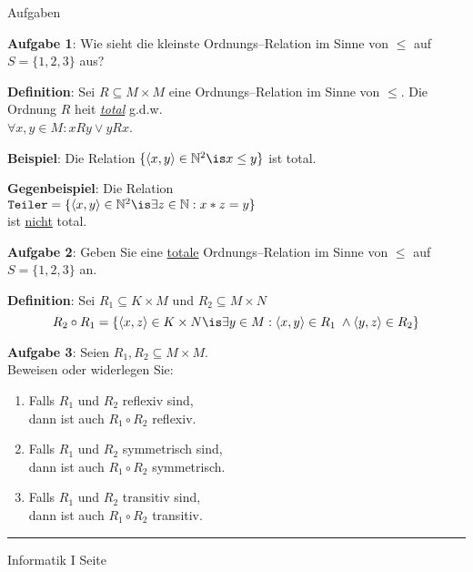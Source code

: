 \begin{slide}{}
\normalsize
\begin{center}
Aufgaben
\end{center}
\vspace{0.5cm}

\footnotesize
\textbf{Aufgabe 1}: Wie sieht die kleinste Ordnungs--Relation im Sinne von $\leq$ auf 
$S = \{1, 2, 3\}$ aus?
\vspace{0.5cm}

\textbf{Definition}: Sei $R \subseteq M \times M$ eine Ordnungs--Relation im Sinne von
$\leq$.  Die Ordnung $R$ hei\3t \underline{\emph{total}} g.d.w. \\[0.3cm]
\hspace*{1.3cm} $\forall x,y \in M: x R y \vee y R x$.

\textbf{Beispiel}: Die Relation $\{ \langle x, y \rangle \in \mathbb{N}^2 \is x \leq y \}$
ist total.

\textbf{Gegenbeispiel}: Die Relation \\[0.3cm]
\hspace*{1.3cm} $\mathtt{Teiler} = \{ \langle x, y \rangle \in \mathbb{N}^2 \is \exists z \in \mathbb{N}: x * z = y \}$ \\[0.3cm]
ist \underline{nicht} total.
\vspace{0.5cm}

\textbf{Aufgabe 2}: Geben Sie eine \underline{totale} Ordnungs--Relation im Sinne von $\leq$ auf 
$S = \{1, 2, 3\}$ an.
\vspace{0.5cm}

\textbf{Definition}: Sei $R_1 \subseteq K \times M$ und $R_2 \subseteq M \times N$
$$  R_2 \circ R_1 = \{ \langle x, z \rangle \in K \times N \is \exists y \in M: \langle x, y \rangle \in R_1\; \wedge
                                                                                \langle y, z \rangle \in R_2 \}$$

\textbf{Aufgabe 3}: Seien $R_1, R_2 \subseteq M \times M$. \\[0.3cm]
Beweisen oder widerlegen Sie:
\begin{enumerate}
\item Falls $R_1$ und $R_2$ reflexiv sind, \\[0.3cm]
      dann ist auch $R_1 \circ R_2$ reflexiv.
\item Falls $R_1$ und $R_2$ symmetrisch sind, \\[0.3cm]
      dann ist auch $R_1 \circ R_2$ symmetrisch.
\item Falls $R_1$ und $R_2$ transitiv sind, \\[0.3cm]
      dann ist auch $R_1 \circ R_2$ transitiv.
\end{enumerate}



\vspace*{\fill}
\tiny \addtocounter{mypage}{1}
\rule{15cm}{1mm}
Informatik I  \hspace*{\fill} Seite 
\end{slide}

